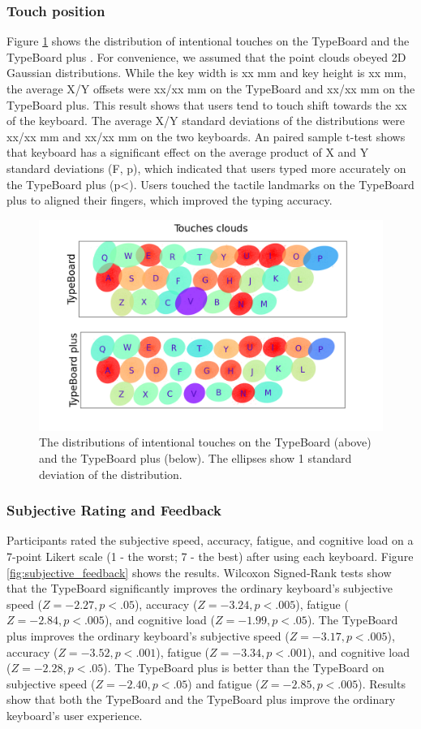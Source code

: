 \subsubsection{Touch position}

Figure \ref{fig:touch_position} shows the distribution of intentional touches on the TypeBoard and the TypeBoard plus . For convenience, we assumed that the point clouds obeyed 2D Gaussian distributions. While the key width is xx mm and key height is xx mm, the average X/Y offsets were xx/xx mm on the TypeBoard and xx/xx mm on the TypeBoard plus. This result shows that users tend to touch shift towards the xx of the keyboard. The average X/Y standard deviations of the distributions were xx/xx mm and xx/xx mm on the two keyboards. An paired sample t-test shows that keyboard has a significant effect on the average product of X and Y standard deviations (F, p), which indicated that users typed more accurately on the TypeBoard plus (p<). Users touched the tactile landmarks on the TypeBoard plus to aligned their fingers, which improved the typing accuracy.

\begin{figure}[!tbh]
	\includegraphics[width=0.8\linewidth]{figures/touch_position.png}
	\centering
	\caption{The distributions of intentional touches on the TypeBoard (above) and the TypeBoard plus (below). The ellipses show 1 standard deviation of the distribution.}
	\label{fig:touch_position}
\end{figure}

\subsubsection{Subjective Rating and Feedback}

Participants rated the subjective speed, accuracy, fatigue, and cognitive load on a 7-point Likert scale (1 - the worst; 7 - the best) after using each keyboard. Figure \ref{fig:subjective_feedback} shows the results. Wilcoxon Signed-Rank tests show that the TypeBoard significantly improves the ordinary keyboard's subjective speed ($Z=-2.27,p<.05$), accuracy ($Z=-3.24,p<.005$), fatigue ($Z=-2.84,p<.005$), and cognitive load ($Z=-1.99,p<.05$). The TypeBoard plus improves the ordinary keyboard's subjective speed ($Z=-3.17,p<.005$), accuracy ($Z=-3.52,p<.001$), fatigue ($Z=-3.34,p<.001$), and cognitive load ($Z=-2.28,p<.05$). The TypeBoard plus is better than the TypeBoard on subjective speed ($Z=-2.40,p<.05$) and fatigue ($Z=-2.85,p<.005$). Results show that both the TypeBoard and the TypeBoard plus improve the ordinary keyboard's user experience.

